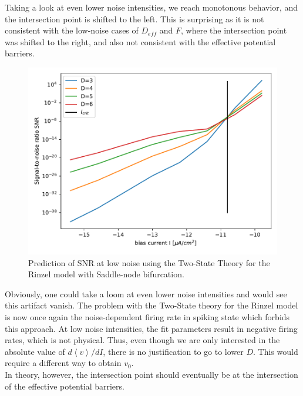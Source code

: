 \documentclass[12pt,a4paper]{article}
\begin{document}
 Taking a look at even lower noise intensities, we reach monotonous behavior, and the intersection point is shifted to the left. This is surprising as it is not consistent with the low-noise cases of $D_{eff}$ and $F$, where the intersection point was shifted to the right, and also not consistent with the effective potential barriers. 
\begin{figure}[H]
	\centering
	\includegraphics[scale=1]{snrinzelpred2.pdf}\caption{Prediction of SNR at low noise  using the Two-State Theory for the Rinzel model with Saddle-node bifurcation.}
	\label{snrinzelpred}
\end{figure}
Obviously, one could take a loom at even lower noise intensities and would see this artifact vanish. The problem with the Two-State theory for the Rinzel model is now once again the noise-dependent firing rate in spiking state which forbids this approach. At low noise intensities, the fit parameters result in negative firing rates, which is not physical. Thus, even though we are only interested in the absolute value of $d\left<v\right>/dI$, there is no justification to go to lower $D$. This would require a different way to obtain $v_0$. \\
In theory, however, the intersection point should eventually be at the intersection of the effective potential barriers.
\end{document}
